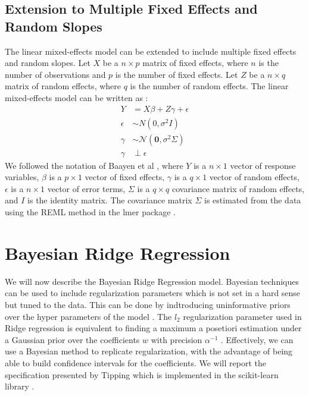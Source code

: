 \subsection{Extension to Multiple Fixed Effects and Random Slopes}
The linear mixed-effects model can be extended to include multiple fixed effects and random slopes. Let $X$ be a $n \times p$ matrix of fixed effects, where $n$ is the number of observations and $p$ is the number of fixed effects. Let $Z$ be a $n \times q$ matrix of random effects, where $q$ is the number of random effects. The linear mixed-effects model can be written as \cite{duke_sta216_lecture}:
\begin{align}
    Y &= X\beta + Z\gamma + \epsilon \\
    \epsilon &\sim N(0, \sigma^2I) \\
    \gamma &\sim \mathcal{N}(\mathbf{0}, \sigma^2\Sigma) \\
    \gamma &\perp \epsilon
\end{align}
We followed the notation of Baayen et al \cite{BAAYEN2008390}, where $Y$ is a $n \times 1$ vector of response variables, $\beta$ is a $p \times 1$ vector of fixed effects, $\gamma$ is a $q \times 1$ vector of random effects, $\epsilon$ is a $n \times 1$ vector of error terms, $\Sigma$ is a $q \times q$ covariance matrix of random effects, and $I$ is the identity matrix. The covariance matrix $\Sigma$ is estimated from the data using the REML method in the lmer package \cite{bates}. 




\section{Bayesian Ridge Regression}
We will now describe the Bayesian Ridge Regression model. Bayesian techniques can be used to include regularization parameters which is not set in a hard sense but tuned to the data. This can be done by indtroducing uninformative priors over the hyper parameters of the model \cite{scikit-learn, mackay_bayesian_1992}. The $l_2$ regularization parameter used in Ridge regression is equivalent to finding a maximum a posetiori estimation under a Gaussian prior over the coefficients $w$ with precision $\alpha^{-1}$ \cite{scikit-learn}. Effectively, we can use a Bayesian method to replicate regularization, with the advantage of being able to build confidence intervals for the coefficients. We will report the specification presented by Tipping \cite{tipping} which is implemented in the scikit-learn library \cite{scikit-learn}.

